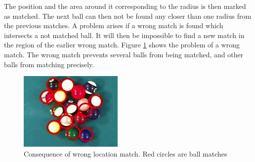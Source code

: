 The position and the area around it corresponding to the radius is then marked as matched. The next ball can then not be found any closer than one radius from the previous matches. A problem arises if a wrong match is found which intersects a not matched ball. It will then be impossible to find a new match in the region of the earlier wrong match.
Figure \ref{fig:wronglocate} shows the problem of a wrong match. The wrong match prevents several balls from being matched, and other balls from matching precisely.
\begin{figure}[h]
\begin{center}
\includegraphics{images/wronglocate.jpg}
\caption{Consequence of wrong location match. Red circles are ball matches}
\label{fig:wronglocate}
\end{center}
\end{figure}
